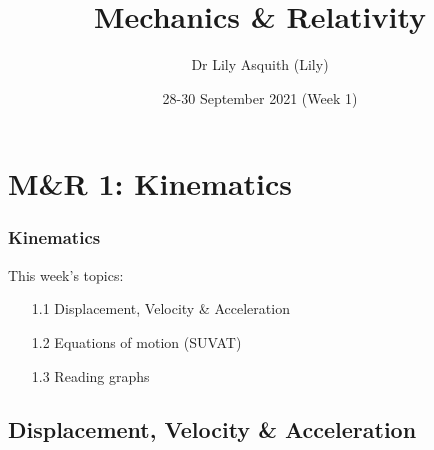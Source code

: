 


% 
\title[ Mechanics \& Relativity]{Mechanics \& Relativity}
\author[Dr Lily Asquith (Lily)]{ Dr Lily Asquith (Lily)}
\date[28-30 September 2021]{28-30 September 2021 (Week 1)}





\begin{frame}
\titlepage
\end{frame} 

\section{M\&R 1: Kinematics}
\begin{frame}
\frametitle{Kinematics} 
\normalsize

This week's topics:\\[3ex]

\begin{itemize}
\item[1.1] Displacement, Velocity \& Acceleration\\[3ex]
\item[1.2] Equations of motion (SUVAT)\\[3ex]
\item[1.3] Reading graphs\\[3ex]
\end{itemize}
\end{frame} 
 
 
 \subsection{Displacement, Velocity \& Acceleration }

